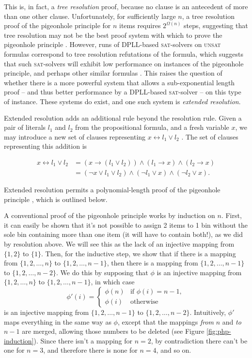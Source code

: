 \documentclass[proof,pdftex,11pt,a4,titlepage]{article}
\newcommand{\sat}{\textsc{sat}}
\newcommand{\unsat}{\textsc{unsat}}
\begin{document}
This is, in fact, a \emph{tree resolution} proof, because no clause is an antecedent of more than one other clause. Unfortunately, for sufficiently large $n$, a tree resolution proof of the pigeonhole principle for $n$ items requires $2^{\Omega(n)}$ steps, suggesting that tree resolution may not be the best proof system with which to prove the pigeonhole principle \cite{Haken:1985}.
However, runs of DPLL-based \sat{}-solvers on \unsat{} formulas correspond to tree resolution refutations of the formula, which suggests that such \sat{}-solvers will exhibit low performance on instances of the pigeonhole principle, and perhaps other similar formulas \cite{Rossi:2006}. This raises the question of whether there is a more powerful system that allows a sub-exponential length proof -- and thus better performance by a DPLL-based \sat{}-solver -- on this type of instance. These systems do exist, and one such system is \emph{extended resolution}.

Extended resolution adds an additional rule beyond the resolution rule. Given a pair of literals $l_1$ and $l_2$ from the propositional formula, and a fresh variable $x$, we may introduce a new set of clauses representing $x \leftrightarrow l_1 \vee l_2$ \cite{Tseitin:1983}. The set of clauses representing this addition is

\begin{equation*}
  \begin{align*}
    x \leftrightarrow l_1 \vee l_2 &= (x \to (l_1 \vee l_2)) \wedge (l_1 \to x) \wedge (l_2 \to x) \\
          &= (\neg x \vee l_1 \vee l_2) \wedge (\neg l_1 \vee x) \wedge (\neg l_2 \vee x).
  \end{align*}
\end{equation*}

Extended resolution permits a polynomial-length proof of the pigeonhole principle \cite{Cook:1976}, which is outlined below.

A conventional proof of the pigeonhole principle works by induction on $n$. First, it can easily be shown that it's not possible to assign 2 items to 1 bin without the sole bin containing more than one item (it will have to contain both!), as we did by resolution above. We will see this as the lack of an injective mapping from $\{1,2\}$ to $\{1\}$. Then, for the inductive step, we show that if there is a mapping from $\{1,2,\ldots,n\}$ to $\{1,2,\ldots,n-1\}$, then there is a mapping from $\{1,2,\ldots,n-1\}$ to $\{1,2,\ldots,n-2\}$. We do this by supposing that $\phi$ is an injective mapping from $\{1,2,\ldots,n\}$ to $\{1,2,\ldots,n-1\}$, in which case
\[\phi'(i) = \begin{cases}
\phi(n) & \mbox{if } \phi(i) = n-1, \\
\phi(i) & \mbox{otherwise}
\end{cases}\]
is an injective mapping from $\{1,2,\ldots,n-1\}$ to $\{1,2,\ldots,n-2\}$. Intuitively, $\phi'$ maps everything in the same way as $\phi$, except that the mappings \emph{from} $n$ and \emph{to} $n-1$ are merged, allowing those numbers to be deleted (see Figure \ref{fig:php-induction}). Since there isn't a mapping for $n=2$, by contradiction there can't be one for $n=3$, and therefore there is none for $n=4$, and so on.
\end{document}
